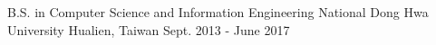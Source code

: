 

\begin{cventries}

  \cventry
    {B.S. in Computer Science and Information Engineering} %
    {National Dong Hwa University} %
    {Hualien, Taiwan} %
    {Sept. 2013 - June 2017} %
    {
    }

\end{cventries}
